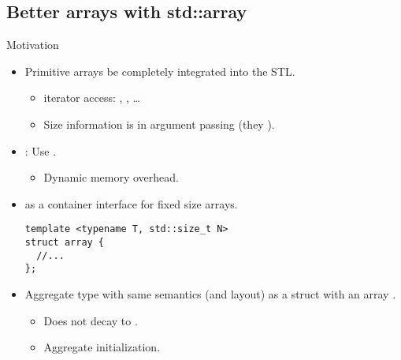 \subsection{Better arrays with std::array}

\begin{frame}[t,fragile]{Motivation}
  \begin{itemize}
    \item Primitive arrays  be completely integrated into the STL.
      \begin{itemize}
        \item {} iterator access: , , \ldots
        \item Size information is  in argument passing 
              (they ).
      \end{itemize}

    \item {}: Use .
      \begin{itemize}
        \item Dynamic memory overhead.
      \end{itemize}

    \item {} as a container interface for fixed size arrays.
\begin{lstlisting}
template <typename T, std::size_t N>
struct array {
  //...
};
\end{lstlisting}

    \item Aggregate type with same semantics (and layout) as a struct with
          an array .
      \begin{itemize}
        \item Does not decay to .
        \item Aggregate initialization.
      \end{itemize}
  \end{itemize}
\end{frame}


